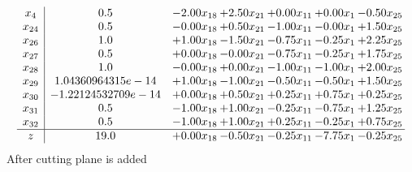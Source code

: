 \documentclass[8pt]{article}
\begin{document}
\[\begin{array}{c| c c@{\hskip 2pt} c@{\hskip 2pt} c@{\hskip 2pt} c@{\hskip 2pt} c@{\hskip 2pt} }
 x_{4}   &  0.5 & -2.00 x_{18} & +  2.50 x_{21} & +  0.00 x_{11} & +  0.00 x_{1} & -0.50 x_{25}\\
 x_{24}   &  0.5 & -0.00 x_{18} & +  0.50 x_{21} & -1.00 x_{11} & -0.00 x_{1} & +  1.50 x_{25}\\
 x_{26}   &  1.0 & +  1.00 x_{18} & -1.50 x_{21} & -0.75 x_{11} & -0.25 x_{1} & +  2.25 x_{25}\\
 x_{27}   &  0.5 & +  0.00 x_{18} & -0.00 x_{21} & -0.75 x_{11} & -0.25 x_{1} & +  1.75 x_{25}\\
 x_{28}   &  1.0 & -0.00 x_{18} & +  0.00 x_{21} & -1.00 x_{11} & -1.00 x_{1} & +  2.00 x_{25}\\
 x_{29}   &  1.04360964315e-14 & +  1.00 x_{18} & -1.00 x_{21} & -0.50 x_{11} & -0.50 x_{1} & +  1.50 x_{25}\\
 x_{30}   &  -1.22124532709e-14 & +  0.00 x_{18} & +  0.50 x_{21} & +  0.25 x_{11} & +  0.75 x_{1} & +  0.25 x_{25}\\
 x_{31}   &  0.5 & -1.00 x_{18} & +  1.00 x_{21} & -0.25 x_{11} & -0.75 x_{1} & +  1.25 x_{25}\\
 x_{32}   &  0.5 & -1.00 x_{18} & +  1.00 x_{21} & +  0.25 x_{11} & -0.25 x_{1} & +  0.75 x_{25}\\
\hline
z    &  19.0 & +  0.00 x_{18} & -0.50 x_{21} & -0.25 x_{11} & -7.75 x_{1} & -0.25 x_{25}\\
\end{array}\]
 After cutting plane is added 
\end{document}
